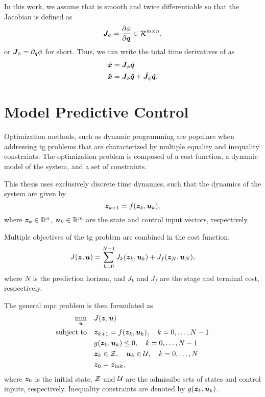 In this work, we assume that \map{} is smooth and twice
differentiable so that the Jacobian is defined as
\begin{equation}
  \bm{J}_{\phi} = \frac{\partial\phi}{\partial\bm{q}} \in \mathcal{R}^{m\times n}, 
\end{equation}
or $\bm{J}_{\phi} = \partial_{\bm{q}}\phi$ for short.
Thus, we can write the total time derivatives of \x{} as
\begin{align}
  \dot{\bm{x}} &= \bm{J}_{\phi}\dot{\bm{q}} \\
  \ddot{\bm{x}} &= \bm{J}_{\phi}\ddot{\bm{q}} + \dot{\bm{J}}_{\phi}\dot{\bm{q}}.
\end{align}


\section{Model Predictive Control} %
\label{sec:model_predictive_control}

Optimization methods, such as dynamic programming are
populare when addressing \ac{tg} problems that are
characterized by multiple equality and inequality
constraints. 
The optimization problem is composed of a cost function, 
a dynamic model of the system, and a set of constraints.

This thesis uses exclusively discrete time dynamics, such
that the dynamics of the system are given by 
\begin{equation}
  \bm{z}_{k+1} = f(\bm{z}_k, \bm{u}_k),
\end{equation}
where $\bm{z}_k \in \mathbb{R}^n$, $\bm{u}_k \in \mathbb{R}^m$ are the state and
control input vectors, respectively. 

Multiple objectives of the \ac{tg} problem are combined in
the cost function:
\begin{equation}
  J(\bm{z},\bm{u}) = \sum_{k=0}^{N-1} J_k(\bm{z}_k, \bm{u}_k) + J_f(\bm{z}_N,\bm{u}_N),
\end{equation}
where $N$ is the prediction horizon, and $J_k$ and $J_f$ are
the stage and terminal cost, respectively.

The general \ac{mpc} problem is then formulated as
\begin{equation}
  \begin{aligned}
    \min_{\bm{u}} \quad & J(\bm{z},\bm{u}) \\
    \text{subject to} \quad & \bm{z}_{k+1} = f(\bm{z}_k, \bm{u}_k), \quad k=0,\ldots,N-1 \\
    & g(\bm{z}_k, \bm{u}_k) \leq 0, \quad k=0,\ldots,N-1 \\
    & \bm{z}_k \in \mathcal{Z}, \quad \bm{u}_k \in \mathcal{U}, \quad k=0,\ldots,N \\
    & \bm{z}_0 = \bm{z}_{\textrm{init}},
  \end{aligned}
\end{equation}
where $\bm{z}_0$ is the initial state, $\mathcal{Z}$ and $\mathcal{U}$ are the
admissibe sets of states and control inputs, respectively.
Inequality constraints are denoted by $g(\bm{z}_k, \bm{u}_k)$.

